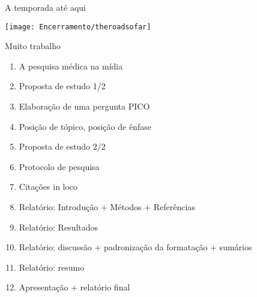 \documentclass{beamer}
\begin{document}
\begin{frame}{A temporada até aqui}
  \begin{center}
    \texttt{[image: Encerramento/theroadsofar]}
  \end{center}
\end{frame}

\begin{frame}{Muito trabalho}
  \begin{enumerate}
    \scriptsize
  \item \alert<5>{A pesquisa médica na mídia}
  \item \alert<2>{Proposta de estudo 1/2}
  \item \alert<2>{Elaboração de uma pergunta PICO}
  \item \alert<5>{Posição de tópico, posição de ênfase}
  \item \alert<2>{Proposta de estudo 2/2}
  \item \alert<3>{Protocolo de pesquisa}
  \item \alert<5>{Citações in loco}
  \item \alert<3>{Relatório: Introdução + Métodos + Referências}
  \item \alert<4>{Relatório: Resultados}
  \item \alert<4>{Relatório: discussão + padronização da formatação + sumários}
  \item \alert<4>{Relatório: resumo}
  \item \alert<4>{Apresentação + relatório final}
  \end{enumerate}

  \begin{center}




  \end{center}
\end{frame}
\end{document}

